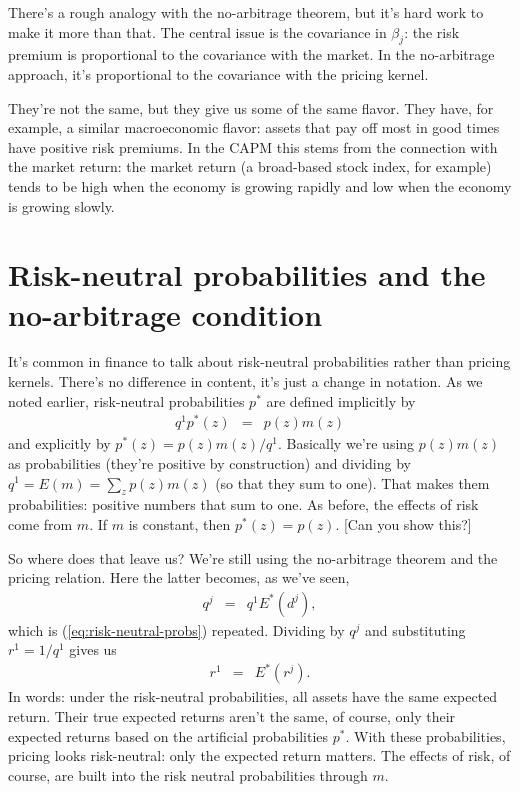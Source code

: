 \documentclass[11pt]{article}
\begin{document}
There's a rough analogy with the no-arbitrage theorem, but it's hard work to make
it more than that.
The central issue is the covariance in $\beta_j$:
the risk premium is proportional to the covariance with the market.
In the no-arbitrage approach, it's proportional to the covariance with
the pricing kernel.

They're not the same, but they give us some of the same flavor.
They have, for example, a similar macroeconomic flavor:
assets that pay off most in good times have positive risk premiums.
In the CAPM this stems from the connection with the market return:
the market return (a broad-based stock index, for example) tends to be high when
the economy is growing rapidly and low when the economy is growing slowly.


\section{Risk-neutral probabilities and the no-arbitrage condition}


It's common in finance to talk about risk-neutral probabilities rather than pricing kernels.
There's no difference in content, it's just a change in notation.
As we noted earlier, risk-neutral probabilities $p^*$ are defined implicitly by
\begin{eqnarray}
    q^1 p^*(z) &=& p(z) m(z)
    \label{eq:def-pstar}
\end{eqnarray}
and explicitly by $  p^*(z) = p(z) m(z)/q^1 $.
Basically we're using $p(z) m(z)$ as probabilities (they're positive by construction)
and dividing by $ q^1 = E(m) = \sum_z p(z) m(z)$ (so that they sum to one).
That makes them probabilities:  positive numbers that sum to one.
As before, the effects of risk come from $m$.
If $m$ is constant, then $p^*(z) = p(z)$.
[Can you show this?]

So where does that leave us?
We're still using the no-arbitrage theorem and the pricing relation.
Here the latter becomes, as we've seen,
\begin{eqnarray*}
    q^j &=& q^1 E^* (d^j),
\end{eqnarray*}
which is (\ref{eq:risk-neutral-probs}) repeated.
Dividing by $q^j$ and substituting $r^1 = 1/q^1$ gives us
\begin{eqnarray*}
    r^1 &=& E^* (r^j).
\end{eqnarray*}
In words:  under the risk-neutral probabilities, all assets have the same expected return.
Their true expected returns aren't the same, of course,
only their expected returns based on the artificial probabilities $p^*$.
With these probabilities, pricing looks risk-neutral:  only the expected return
matters.
The effects of risk, of course, are built into the risk neutral probabilities through $m$.
\end{document}
